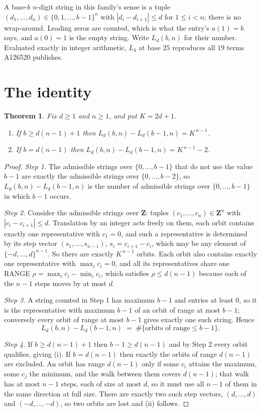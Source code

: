 \documentclass[11pt,a4paper]{article}
\theoremstyle{plain}
\newtheorem{theorem}{Theorem}
\theoremstyle{definition}
\begin{document}
A base-$b$ $n$-digit string in this family's sense is a tuple
$(d_1,\dots,d_n)\in\{0,1,\dots,b-1\}^{n}$ with $|d_i-d_{i+1}|\le d$ for $1\le i<n$; there
is no wrap-around. Leading zeros are counted, which is what the entry's $a(1)=b$ says, and
$a(0)=1$ is the empty string. Write $L_d(b,n)$ for their number. Evaluated exactly in integer
arithmetic, $L_{4}$ at base $25$ reproduces all $19$ terms A126520 publishes.

\section{The identity}

\begin{theorem}
Fix $d\ge1$ and $n\ge1$, and put $K=2d+1$.
\begin{enumerate}
\item[(i)] If $b\ge d(n-1)+1$ then $L_d(b,n)-L_d(b-1,n)=K^{\,n-1}$.
\item[(ii)] If $b=d(n-1)$ then $L_d(b,n)-L_d(b-1,n)=K^{\,n-1}-2$.
\end{enumerate}
\end{theorem}

\begin{proof}
\emph{Step 1.} The admissible strings over $\{0,\dots,b-1\}$ that do not use the value $b-1$
are exactly the admissible strings over $\{0,\dots,b-2\}$, so $L_d(b,n)-L_d(b-1,n)$ is the
number of admissible strings over $\{0,\dots,b-1\}$ in which $b-1$ occurs.

\emph{Step 2.} Consider the admissible strings over $\mathbf{Z}$: tuples
$(c_1,\dots,c_n)\in\mathbf{Z}^{n}$ with $|c_i-c_{i+1}|\le d$. Translation by an integer acts
freely on them, each orbit contains exactly one representative with $c_1=0$, and such a
representative is determined by its step vector $(s_1,\dots,s_{n-1})$, $s_i=c_{i+1}-c_i$,
which may be any element of $\{-d,\dots,d\}^{n-1}$. So there are exactly $K^{\,n-1}$ orbits.
Each orbit also contains exactly one representative with $\max_i c_i=0$, and all its
representatives share one RANGE $\rho=\max_ic_i-\min_ic_i$, which satisfies
$\rho\le d(n-1)$ because each of the $n-1$ steps moves by at most $d$.

\emph{Step 3.} A string counted in Step 1 has maximum $b-1$ and entries at least $0$, so it is
the representative with maximum $b-1$ of an orbit of range at most $b-1$; conversely every orbit
of range at most $b-1$ gives exactly one such string. Hence
\[
L_d(b,n)-L_d(b-1,n)\;=\;\#\{\text{orbits of range}\le b-1\} .
\]

\emph{Step 4.} If $b\ge d(n-1)+1$ then $b-1\ge d(n-1)$ and by Step 2 every orbit qualifies,
giving (i). If $b=d(n-1)$ then exactly the orbits of range $d(n-1)$ are excluded. An orbit has
range $d(n-1)$ only if some $c_i$ attains the maximum, some $c_j$ the minimum, and the walk
between them covers $d(n-1)$; that walk has at most $n-1$ steps, each of size at most $d$, so it
must use all $n-1$ of them in the same direction at full size. There are exactly two such step
vectors, $(d,\dots,d)$ and $(-d,\dots,-d)$, so two orbits are lost and (ii) follows.
\end{proof}
\end{document}
